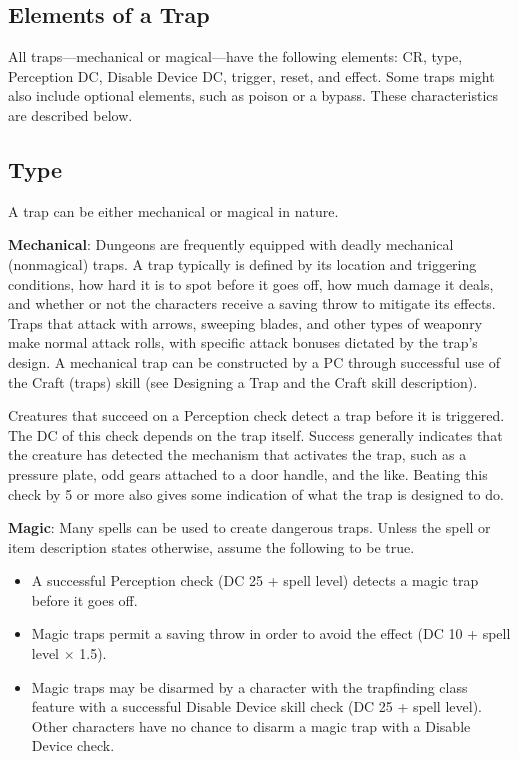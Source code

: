 \subsection{Elements of a Trap}

				
All traps---mechanical or magical---have the following elements: CR, type, Perception DC, Disable Device DC, trigger, reset, and effect. Some traps might also include optional elements, such as poison or a bypass. These characteristics are described below.
				
\subsection{Type}

				
A trap can be either mechanical or magical in nature. 
				
\textbf{Mechanical}: Dungeons are frequently equipped with deadly mechanical (nonmagical) traps. A trap typically is defined by its location and triggering conditions, how hard it is to spot before it goes off, how much damage it deals, and whether or not the characters receive a saving throw to mitigate its effects. Traps that attack with arrows, sweeping blades, and other types of weaponry make normal attack rolls, with specific attack bonuses dictated by the trap's design. A mechanical trap can be constructed by a PC through successful use of the Craft (traps) skill (see Designing a Trap and the Craft skill description).
				
Creatures that succeed on a Perception check detect a trap before it is triggered. The DC of this check depends on the trap itself. Success generally indicates that the creature has detected the mechanism that activates the trap, such as a pressure plate, odd gears attached to a door handle, and the like. Beating this check by 5 or more also gives some indication of what the trap is designed to do.
				
\textbf{Magic}: Many spells can be used to create dangerous traps. Unless the spell or item description states otherwise, assume the following to be true.
				\begin{itemize}\item  A successful Perception check (DC 25 + spell level) detects a magic trap before it goes off. 
				\item  Magic traps permit a saving throw in order to avoid the effect (DC 10 + spell level \mbox{$\times$} 1.5).
				\item  Magic traps may be disarmed by a character with the trapfinding class feature with a successful Disable Device skill check (DC 25 + spell level). Other characters have no chance to disarm a magic trap with a Disable Device check.
\end{itemize}
				
